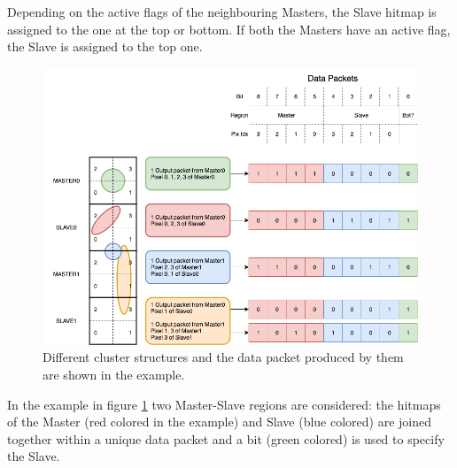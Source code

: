         Depending on the active flags of the neighbouring Masters, the Slave hitmap is assigned to the one at the top or bottom. 
        If both the Masters have an active flag, the Slave is assigned to the top one. 
        \begin{figure}[h!]
            \centering
            \includegraphics[width=.95\linewidth]{figures/ARCADIA/clustering.png}
            \caption{Different cluster structures and the data packet produced by them are shown in the example.}
            \label{fig:clustering}
        \end{figure}
        In the example in figure \ref{fig:clustering} two Master-Slave regions are considered: the hitmaps of the Master (red colored in the example) and Slave (blue colored) are joined together within a unique data packet and a bit (green colored) is used to specify the Slave. 

